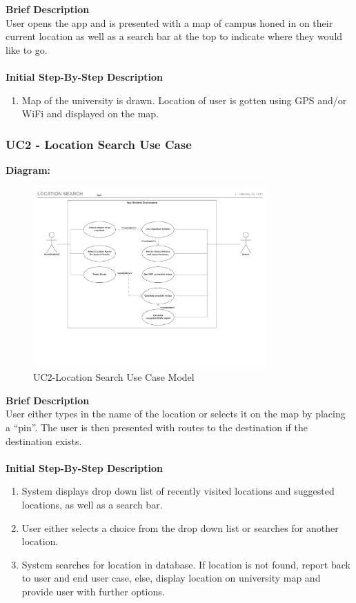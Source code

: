 \documentclass[a4paper, 12pt, one column, aas_macros]{article}
\begin{document}
\textbf{Brief Description}\\
User opens the app and is presented with a map of campus honed in on their current location as well as a search bar at the top to indicate where they would like to go.\\
\\\textbf{Initial Step-By-Step Description}
\begin{enumerate}
\item Map of the university is drawn. Location of user is gotten using GPS and/or WiFi and displayed on the map.
\end{enumerate}



\clearpage

\subsubsection{UC2 - Location Search Use Case}
\textbf{Diagram:}
\begin{figure}[H]
\centering
\includegraphics[width=0.8\textwidth]{Location_Search_Use-Case.pdf}
\caption{UC2-Location Search Use Case Model}
\end{figure}

\textbf{Brief Description}\\
User either types in the name of the location or selects it on the map by placing a “pin”. The user is then presented with routes to the destination if the destination exists.\\
\\\textbf{Initial Step-By-Step Description}\\
\begin{enumerate}
\item System displays drop down list of recently visited locations and suggested locations, as well as a search bar.
\item User either selects a choice from the drop down list or searches for another location.
\item System searches for location in database. If location is not found, report back to user and end user case, else, display location on university map and provide user with further options.
\end{enumerate}
\end{document}

